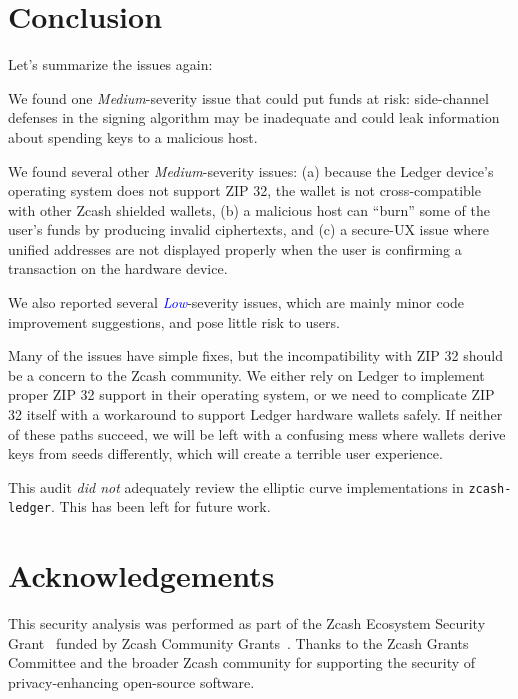 \documentclass[10pt,titlepage]{article}
\newcommand{\MediumIssue}{\textcolor{darkyellow}{\emph{Medium}}}
\newcommand{\LowIssue}{\textcolor{blue}{\emph{Low}}}
\begin{document}
\section{Conclusion} \label{secconclusion}

Let's summarize the issues again:

We found one \MediumIssue-severity issue that could put funds at risk:
side-channel defenses in the signing algorithm may be inadequate and could leak
information about spending keys to a malicious host.

We found several other \MediumIssue-severity issues: (a) because the Ledger
device's operating system does not support ZIP 32, the wallet is not
cross-compatible with other Zcash shielded wallets, (b) a malicious host can
``burn'' some of the user's funds by producing invalid ciphertexts, and (c) a
secure-UX issue where unified addresses are not displayed properly when the user
is confirming a transaction on the hardware device.

We also reported several \LowIssue-severity issues, which are mainly minor code
improvement suggestions, and pose little risk to users.

Many of the issues have simple fixes, but the incompatibility with ZIP 32 should
be a concern to the Zcash community. We either rely on Ledger to implement
proper ZIP 32 support in their operating system, or we need to complicate ZIP 32
itself with a workaround to support Ledger hardware wallets safely. If neither
of these paths succeed, we will be left with a confusing mess where wallets
derive keys from seeds differently, which will create a terrible user experience.

This audit \emph{did not} adequately review the elliptic curve implementations
in \texttt{zcash-ledger}. This has been left for future work.


\section*{Acknowledgements}

This security analysis was performed as part of the Zcash Ecosystem Security
Grant~\cite{zecsec, zecsecweb} funded by Zcash Community Grants~\cite{zcg}. Thanks to the
Zcash Grants Committee and the broader Zcash community for supporting the
security of privacy-enhancing open-source software.
\end{document}
